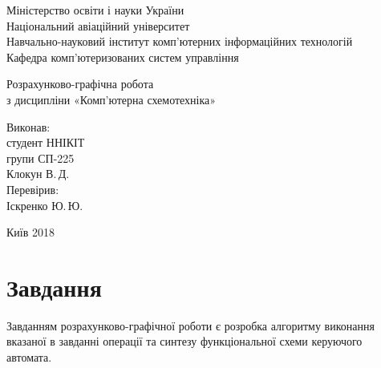 \documentclass[
	a4paper,
	oneside,
	DIV = 12,
	12pt,
	headings = normal,
]{scrartcl}
\begin{document}
	\begin{titlepage}
		\begin{center}
			Міністерство освіти і науки України\\
			Національний авіаційний університет\\
			Навчально-науковий інститут комп'ютерних інформаційних технологій\\
			Кафедра комп'ютеризованих систем управління

			\vspace{\fill}
				Розрахунково-графічна робота\\
				з дисципліни «Комп'ютерна схемотехніка»\\

			\vspace{\fill}

			\begin{flushright}
				Виконав:\\
				студент ННІКІТ\\
				групи СП-225\\
				Клокун В.\,Д.\\
				Перевірив:\\
				Іскренко Ю.\,Ю.
			\end{flushright}

			Київ 2018
		\end{center}
	\end{titlepage}

	\section{Завдання}
		Завданням розрахунково-графічної роботи є розробка алгоритму виконання вказаної в завданні операції та синтезу функціональної схеми керуючого автомата.
\end{document}
